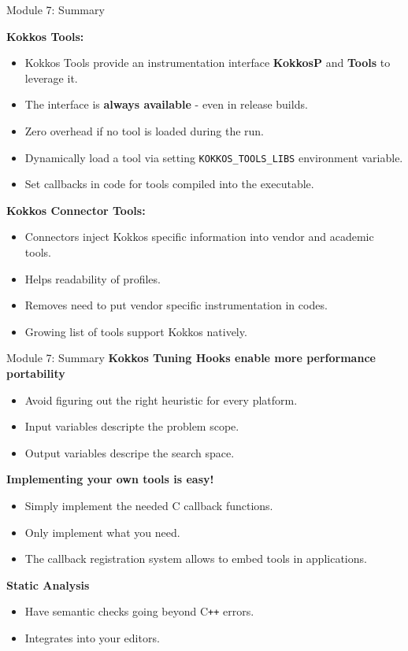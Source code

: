 

%




\begin{frame}[fragile]{Module 7: Summary}

\textbf{Kokkos Tools:}
\begin{itemize}
  \item Kokkos Tools provide an instrumentation interface \textbf{KokkosP} and \textbf{Tools} to leverage it.
  \item The interface is \textbf{always available} - even in release builds.
  \item Zero overhead if no tool is loaded during the run.
  \item Dynamically load a tool via setting \texttt{KOKKOS\_TOOLS\_LIBS} environment variable.
  \item Set callbacks in code for tools compiled into the executable. 
\end{itemize}

\textbf{Kokkos Connector Tools:}
\begin{itemize}
  \item Connectors inject Kokkos specific information into vendor and academic tools.
  \item Helps readability of profiles.
  \item Removes need to put vendor specific instrumentation in codes.
  \item Growing list of tools support Kokkos natively.
\end{itemize}
\end{frame}

\begin{frame}[fragile]{Module 7: Summary}
\textbf{Kokkos Tuning Hooks enable more performance portability}
\begin{itemize}
  \item Avoid figuring out the right heuristic for every platform.
  \item Input variables descripte the problem scope.
  \item Output variables descripe the search space.
\end{itemize}

\textbf{Implementing your own tools is easy!}
\begin{itemize}
  \item Simply implement the needed C callback functions.
  \item Only implement what you need.
  \item The callback registration system allows to embed tools in applications.
\end{itemize}

\textbf{Static Analysis}
\begin{itemize}
  \item Have semantic checks going beyond C\texttt{++} errors.
  \item Integrates into your editors.
\end{itemize}
\end{frame}

